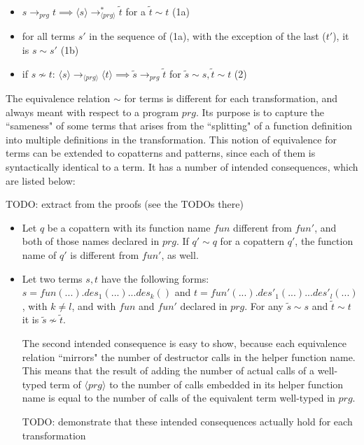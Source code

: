 \documentclass[11pt]{article} %
\begin{document}
\begin{itemize}
\item $s \longrightarrow_{prg} t \implies \langle s \rangle  \longrightarrow^*_{\langle prg \rangle} \tilde{t}$ for a $\tilde{t} \sim t$ (1a)

\item for all terms $s'$ in the sequence of (1a), with the exception of the last ($t'$), it is $s \sim s'$ (1b)

\item if $s \not\sim t$: $\langle s \rangle \longrightarrow_{\langle prg \rangle} \langle t \rangle \implies \tilde{s} \longrightarrow_{prg} \tilde{t}$ for $\tilde{s} \sim s, \tilde{t} \sim t$ (2)

\end{itemize}

The equivalence relation $\sim$ for terms is different for each transformation, and always meant with respect to a program $prg$. Its purpose is to capture the ``sameness" of some terms that arises from the ``splitting" of a function definition into multiple definitions in the transformation. This notion of equivalence for terms can be extended to copatterns and patterns, since each of them is syntactically identical to a term. It has a number of intended consequences, which are listed below:

TODO: extract from the proofs (see the TODOs there)

\begin{itemize}

\item Let $q$ be a copattern with its function name $fun$ different from $fun'$, and both of those names declared in $prg$. If $q' \sim q$ for a copattern $q'$, the function name of $q'$ is different from $fun'$, as well.

\item Let two terms $s,t$ have the following forms: $s = fun(...).des_1(...)...des_k()$ and $t = fun'(...).des'_1(...)...des'_l(...)$, with $k \neq l$, and with $fun$ and $fun'$ declared in $prg$. For any $\widetilde{s} \sim s$ and $\widetilde{t} \sim t$ it is $\widetilde{s} \not\sim \widetilde{t}$.

The second intended consequence is easy to show, because each equivalence relation ``mirrors" the number of destructor calls in the helper function name. This means that the result of adding the number of actual calls of a well-typed term of $\langle prg \rangle$ to the number of calls embedded in its helper function name is equal to the number of calls of the equivalent term well-typed in $prg$.

TODO: demonstrate that these intended consequences actually hold for each transformation

\end{itemize}
\end{document}
